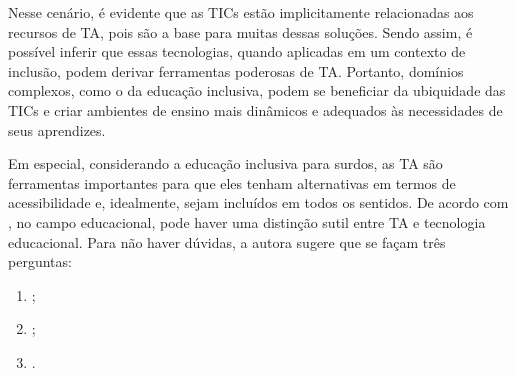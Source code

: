 
Nesse cenário, é evidente que as TICs estão implicitamente relacionadas aos recursos de TA, pois são a base para muitas dessas soluções. Sendo assim, é possível inferir que essas tecnologias, quando aplicadas em um contexto de inclusão, podem derivar ferramentas poderosas de TA. Portanto, domínios complexos, como o da educação inclusiva, podem se beneficiar da ubiquidade das TICs e criar ambientes de ensino mais dinâmicos e adequados às necessidades de seus aprendizes.

Em especial, considerando a educação inclusiva para surdos, as TA são ferramentas importantes para que eles tenham alternativas em termos de acessibilidade e, idealmente, sejam incluídos em todos os sentidos. De acordo com , no campo educacional, pode haver uma distinção sutil entre TA e tecnologia educacional. Para não haver dúvidas, a autora sugere que se façam três perguntas:

\begin{enumerate}
\item {} \cite{Bersch2017};
\item {} \cite{Bersch2017};
\item {} \cite{Bersch2017}.
\end{enumerate}

